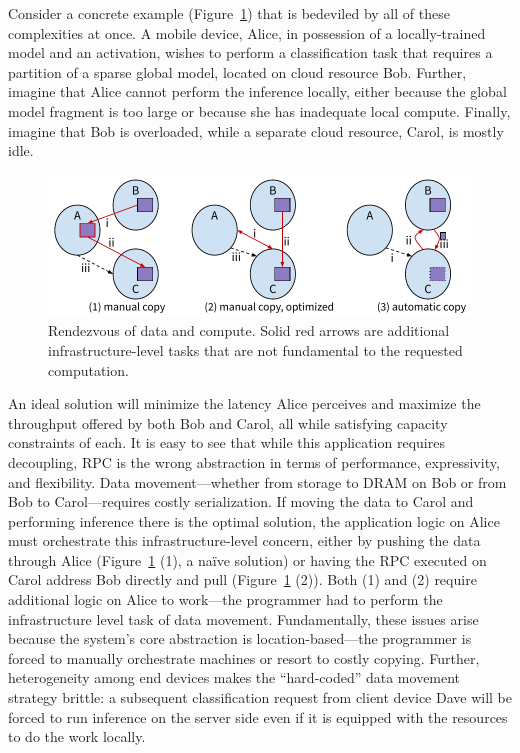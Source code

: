 Consider a concrete example (Figure~\ref{fig:rpccopy}) that is bedeviled by all of these complexities at once. A mobile device,
Alice, in possession of a locally-trained model and an activation, wishes to perform a
classification task that requires a partition of a sparse global model, located on cloud resource
Bob. Further, imagine that Alice cannot perform the inference locally, either because the global
model fragment is too large or because she has inadequate local compute. Finally, imagine that Bob
is overloaded, while a separate cloud resource, Carol, is mostly idle.


\begin{figure}
    \centering
    \includegraphics[width=\linewidth]{fig/copy}
    \caption[Rendezvous of data and compute]{Rendezvous of data and compute. Solid red arrows are additional
        infrastructure-level tasks that are not fundamental to the requested computation.}
    \label{fig:rpccopy}
\end{figure}

An ideal solution will minimize the latency Alice perceives and maximize the throughput offered
by both Bob and Carol, all while satisfying capacity constraints of each. It is easy to see
that while this application requires decoupling, RPC is the wrong abstraction in terms of performance,
expressivity, and flexibility.  Data movement---whether from storage to DRAM on Bob or from Bob
to Carol---requires costly serialization. If moving the data to Carol and performing
inference there is the optimal solution, the application logic on Alice must orchestrate this
infrastructure-level concern, either by pushing the data through Alice (Figure~\ref{fig:rpccopy} (1), a na\"ive solution)
or having the RPC executed
on Carol address Bob directly and pull (Figure~\ref{fig:rpccopy} (2)).
Both (1) and (2) require additional logic on Alice
to work---the programmer had to perform the infrastructure level task of data
movement.  Fundamentally, these issues arise because the system's core abstraction is
location-based---the programmer is forced to manually orchestrate machines or resort to
costly copying.
Further,
heterogeneity among end devices makes the ``hard-coded'' data movement strategy
brittle:
a subsequent classification request from client device Dave will be forced to run inference
on the server side even if it is equipped with the resources to do the work locally.

